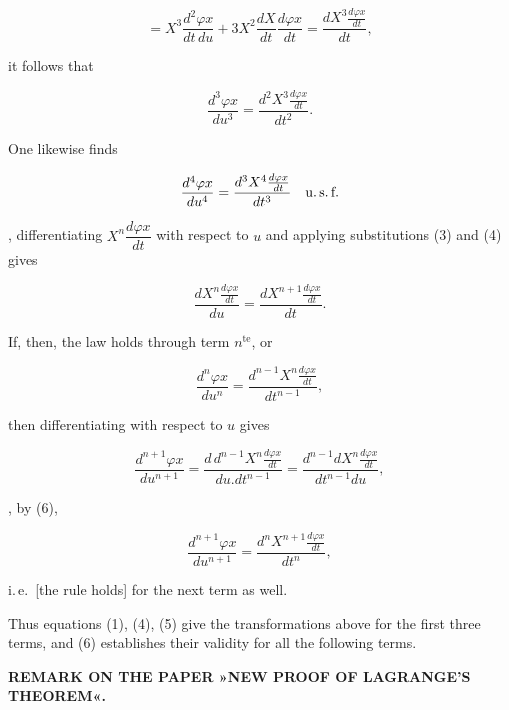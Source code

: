 
\[
= X^3\frac{d^2\varphi x}{dt\,du} + 3X^2\frac{dX}{dt}\frac{d\varphi x}{dt}
= \frac{dX^3 \frac{d\varphi x}{dt}}{dt},
\]

\noindent
it follows that

\begin{equation}\tag{5}
\frac{d^3\varphi x}{du^3} = \frac{d^2X^3 \frac{d\varphi x}{dt}}{dt^2}.
\end{equation}

\noindent\hspace*{\parindent}One likewise finds

\[
\frac{d^4\varphi x}{du^4} = \frac{d^3X^4 \frac{d\varphi x}{dt}}{dt^3} \quad \text{u.\,s.\,f.}
\]

\noindent\hspace*{\parindent}, differentiating $X^n\dfrac{d\varphi x}{dt}$ with respect to $u$ and applying
substitutions (3) and (4) gives

\begin{equation}\tag{6}
\frac{dX^n \frac{d\varphi x}{dt}}{du} = \frac{dX^{n+1} \frac{d\varphi x}{dt}}{dt}.
\end{equation}

\noindent
If, then, the law holds through term $n^{\text{te}}$, or

\[
\frac{d^n\varphi x}{du^n} = \frac{d^{n-1}X^n \frac{d\varphi x}{dt}}{dt^{n-1}},
\]

\noindent
then differentiating with respect to $u$ gives

\[
\frac{d^{n+1}\varphi x}{du^{n+1}} = \frac{d\,d^{n-1}X^n\frac{d\varphi x}{dt}}{du . dt^{n-1}}
= \frac{d^{n-1}dX^n\frac{d\varphi x}{dt}}{dt^{n-1}du},
\]

\noindent
[thus], by (6),

\begin{equation}\tag{7}
\frac{d^{n+1}\varphi x}{du^{n+1}} = \frac{d^nX^{n+1} \frac{d\varphi x}{dt}}{dt^n},
\end{equation}

\noindent
i.\,e.\ [the rule holds] for the next term as well.

\noindent\hspace*{\parindent}Thus equations (1), (4), (5) give the transformations above for the first three
terms, and (6) establishes their validity for all the following terms.

\medskip

\begin{center}
\textbf{REMARK ON THE PAPER »NEW PROOF OF LAGRANGE'S THEOREM«.}
\end{center}

